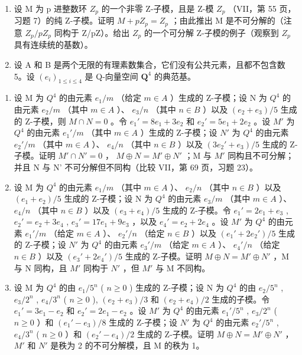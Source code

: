 \begin{enumerate}
\def\labelenumi{\arabic{enumi})}
\setcounter{enumi}{9}
\item
  设 M 为 p 进整数环 \(Z_{p}\) 的一个非零 Z-子模，且是 Z-模 \(Z_{p}\) （VII，第 55 页，习题 7）的纯 Z-子模。证明 \(M + pZ_{p} = Z_{p}\) ；由此推出 M 是不可分解的（注意 \(Z_{p}/pZ_{p}\) 同构于 Z/pZ）。给出 \(Z_{p}\) 的一个可分解 Z-子模的例子（观察到 \(Z_{p}\) 具有连续统的基数）。
\item
  设 A 和 B 是两个无限的有理素数集合，它们没有公共元素，且都不包含数 5。设 \((e_i)_{1 \leqslant i \leqslant 4}\) 是 Q-向量空间 \(\mathbf{Q}^4\) 的典范基。
\end{enumerate}

\begin{enumerate}
\def\labelenumi{\alph{enumi})}
\item
  设 M 为 \(Q^{4}\) 的由元素 \(e_{1}/m\) （给定 \(m \in A\) ）生成的 Z-子模；设 N 为 \(Q^{4}\) 的由元素 \(e_{2}/m\) （其中 \(m \in A\) ）、 \(e_{3}/n\) （其中 \(n \in B\) ）以及 \((e_{2} + e_{3})/5\) 生成的 Z-子模，则 \(M \cap N = 0\) 。令 \(e_{1}' = 8e_{1} + 3e_{2}\) 和 \(e_{2}' = 5e_{1} + 2e_{2}\) 。设 \(M'\) 为 \(Q^{4}\) 的由元素 \(e_{1}'/m\) （其中 \(m \in A\) ）生成的 Z-子模；设 \(N'\) 为 \(Q^{4}\) 的由元素 \(e_{2}'/m\) （其中 \(m \in A\) ）、 \(e_{4}/n\) （其中 \(n \in B\) ）以及 \((3e_{2}' + e_{3})/5\) 生成的 Z-子模。证明 \(M' \cap N' = 0\) ， \(M \oplus N = M' \oplus N'\) ；M 与 \(M'\) 同构且不可分解；并且 N 与 N' 不可分解但不同构（比较 VII，第 69 页，习题 23）。
\item
  设 M 为 \(Q^{4}\) 的由元素 \(e_{1}/m\) （其中 \(m \in A\) ）、 \(e_{2}/n\) （其中 \(n \in B\) ）以及 \((e_{1} + e_{2})/5\) 生成的 Z-子模；设 N 为 \(Q^{4}\) 的由元素 \(e_{3}/m\) （其中 \(m \in A\) ）、 \(e_{4}/n\) （其中 \(n \in B\) ）以及 \((e_{3} + e_{4})/5\) 生成的 Z-子模。令 \(e_{1}' = 2e_{1} + e_{3}\) , \(e_{2}' = e_{2} + 3e_{4}\) , \(e_{3}' = 17e_{1} + 9e_{3}\) ，以及 \(e_{4}' = e_{2} + 2e_{4}\) 。设 \(M'\) 为 \(Q^{4}\) 的由元素 \(e_{1}'/m\) （给定 \(m \in A\) ）、 \(e_{2}'/n\) （给定 \(n \in B\) ）以及 \((e_{1}' + 2e_{2}')/5\) 生成的 Z-子模；设 \(N'\) 为 \(Q^{4}\) 的由元素 \(e_{3}'/m\) （给定 \(m \in A\) ）、 \(e_{4}'/n\) （给定 \(n \in B\) ）以及 \((e_{3}' + 2e_{4}')/5\) 生成的 Z-子模。证明 \(M \oplus N = M' \oplus N'\) ，M 与 N 同构，且 \(M'\) 同构于 \(N'\) ，但 \(M'\) 与 M 不同构。
\item
  设 M 为 \(Q^{4}\) 的由 \(e_{1}/5^{n}\) ( \(n \geqslant 0\) ) 生成的 Z-子模；设 N 为 \(Q^{4}\) 的由 \(e_{2}/5^{n}\) , \(e_{3}/2^{n}\) , \(e_{4}/3^{n}\) ( \(n \geqslant 0\) ), \((e_{2} + e_{3})/3\) 和 \((e_{2} + e_{4})/2\) 生成的子模。令 \(e_{1}' = 3e_{1} - e_{2}\) 和 \(e_{2}' = 2e_{1} - e_{2}\) 。设 \(M'\) 为 \(Q^{4}\) 的由元素 \(e_{1}'/5^{n}\) , \(e_{3}/2^{n}\) ( \(n \geqslant 0\) ）和 \((e_{1}' - e_{3})/8\) 生成的 Z-子模；设 \(N'\) 为 \(Q^{4}\) 的由元素 \(e_{2}'/5^{n}\) , \(e_{4}/3^{n}\) ( \(n \geqslant 0\) ）和 \((e_{2}' - e_{4})/2\) 生成的 Z-子模。证明 \(M \oplus N = M' \oplus N'\) ， \(M'\) 和 \(N'\) 是秩为 2 的不可分解模，且 M 的秩为 1。
\end{enumerate}
